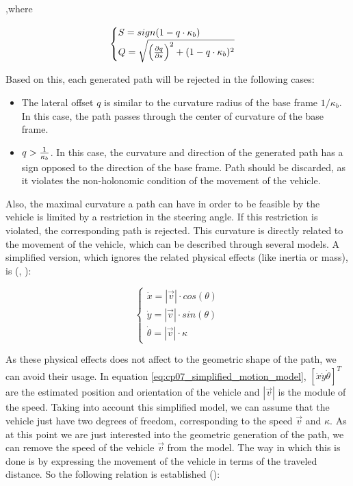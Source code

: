 ,where 

\begin{equation}\label{eq:cp07_path_curvature_s_and_q}
\begin{cases}
S=sign(1 - q \cdot \kappa_b)\\
Q=\sqrt{\left ( { {\partial q} \over {\partial s}} \right ) ^2+ (1 - q \cdot \kappa_b)^2}
\end{cases}
\end{equation}

Based on this, each generated path will be rejected in the following cases:
\begin{itemize}
 \item The lateral offset $q$ is similar to the curvature radius of the base frame $1 / \kappa_b$. In this case, the path passes through the center of curvature of the base frame.
 \item $q > {1 \over \kappa_b}$. In this case, the curvature and direction of the generated path has a sign opposed to the direction of the base frame. Path should be discarded, as it violates the non-holonomic condition of the movement of the vehicle.
\end{itemize}

Also, the maximal curvature a path can have in order to be feasible by the vehicle is limited by a restriction in the steering angle. If this restriction is violated, the corresponding path is rejected. This curvature is directly related to the movement of the vehicle, which can be described through several models. A simplified version, which ignores the related physical effects (like inertia or mass), is (\cite{chu2012local}, \cite{barfoot2004motion}):

\begin{equation}\label{eq:cp07_simplified_motion_model}
\begin{cases}
\dot{x} = |\vec{v}| \cdot cos(\theta) \\
\dot{y} = |\vec{v}| \cdot sin(\theta) \\
\dot{\theta} = |\vec{v}| \cdot \kappa
\end{cases}
\end{equation}

As these physical effects does not affect to the geometric shape of the path, we can avoid their usage. In equation \ref{eq:cp07_simplified_motion_model}, $[\dot{x} \dot{y} \dot{\theta} ]^T$ are the estimated position and orientation of the vehicle and $|\vec{v}|$ is the module of the speed. Taking into account this simplified model, we can assume that the vehicle just have two degrees of freedom, corresponding to the speed $\vec{v}$ and $\kappa$. As at this point we are just interested into the geometric generation of the path, we can remove the speed of the vehicle $\vec{v}$ from the model. The way in which this is done is by expressing the movement of the vehicle in terms of the traveled distance. So the following relation is established (\cite{chu2012local}):

